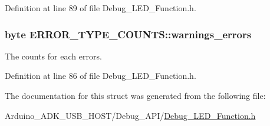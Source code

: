 Definition at line 89 of file Debug\-\_\-\-L\-E\-D\-\_\-\-Function.\-h.

\hypertarget{struct_e_r_r_o_r___t_y_p_e___c_o_u_n_t_s_a64c977b503d70640ec9684efb24c4202}{
\subsubsection[{warnings\-\_\-errors}]{\setlength{\rightskip}{0pt plus 5cm}byte E\-R\-R\-O\-R\-\_\-\-T\-Y\-P\-E\-\_\-\-C\-O\-U\-N\-T\-S\-::warnings\-\_\-errors}}\label{struct_e_r_r_o_r___t_y_p_e___c_o_u_n_t_s_a64c977b503d70640ec9684efb24c4202}


The counts for each errors. 



Definition at line 86 of file Debug\-\_\-\-L\-E\-D\-\_\-\-Function.\-h.



The documentation for this struct was generated from the following file\-:\begin{DoxyCompactItemize}
\item 
Arduino\-\_\-\-A\-D\-K\-\_\-\-U\-S\-B\-\_\-\-H\-O\-S\-T/\-Debug\-\_\-\-A\-P\-I/\hyperlink{_debug___l_e_d___function_8h}{Debug\-\_\-\-L\-E\-D\-\_\-\-Function.\-h}\end{DoxyCompactItemize}
